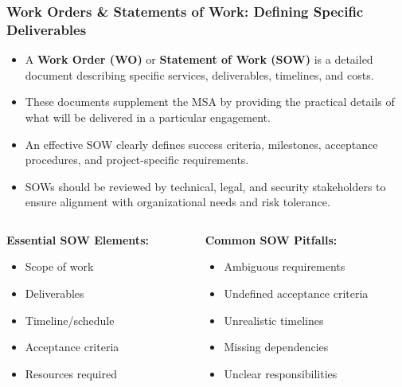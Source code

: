 \documentclass{beamer}
\begin{document}
\begin{frame}
    \frametitle{Work Orders \& Statements of Work: Defining Specific Deliverables}
    
    \begin{itemize}
        \item A \textbf{Work Order (WO)} or \textbf{Statement of Work (SOW)} is a detailed document describing specific services, deliverables, timelines, and costs.
        \item These documents supplement the MSA by providing the practical details of what will be delivered in a particular engagement.
        \item An effective SOW clearly defines success criteria, milestones, acceptance procedures, and project-specific requirements.
        \item SOWs should be reviewed by technical, legal, and security stakeholders to ensure alignment with organizational needs and risk tolerance.
    \end{itemize}
    
    \begin{columns}
        \scriptsize
        \begin{column}{0.48\textwidth}
            \textbf{Essential SOW Elements:}
            \begin{itemize}
                \item Scope of work
                \item Deliverables
                \item Timeline/schedule
                \item Acceptance criteria
                \item Resources required
            \end{itemize}
        \end{column}
        \begin{column}{0.48\textwidth}
            \textbf{Common SOW Pitfalls:}
            \begin{itemize}
                \item Ambiguous requirements
                \item Undefined acceptance criteria
                \item Unrealistic timelines
                \item Missing dependencies
                \item Unclear responsibilities
            \end{itemize}
        \end{column}
    \end{columns}
\end{frame}
\end{document}
